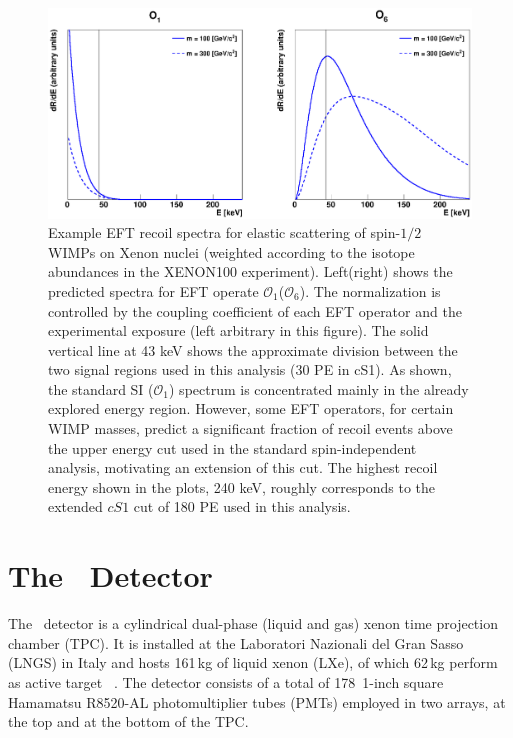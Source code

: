 \begin{figure}[h!]
\centerline{\includegraphics[width=1.\linewidth]{Figures/drdeO1O6.eps}}
\caption{Example EFT recoil spectra for elastic scattering of spin-$1/2$ WIMPs on Xenon nuclei (weighted according to the isotope abundances in the XENON100 experiment). Left(right) shows the predicted spectra for EFT operate $\mathcal{O}_1$($\mathcal{O}_6$). The normalization is controlled by the coupling coefficient of each EFT operator and the experimental exposure (left arbitrary in this figure). The solid vertical line at 43 keV shows the approximate division between the two signal regions used in this analysis (30 PE in cS1). As shown, the standard SI ($\mathcal{O}_1$) spectrum is concentrated mainly in the already explored energy region. However, some EFT operators, for certain WIMP masses, predict a significant fraction of recoil events above the upper energy cut used in the standard spin-independent analysis, motivating an extension of this cut. The highest recoil energy shown in the plots, 240 keV, roughly corresponds to the extended $cS1$ cut of 180 PE used in this analysis.}
\label{fig:dRdE}
\end{figure}

\section{The \Xehund\  Detector}
The \Xehund\ detector is a cylindrical %
dual-phase (liquid and gas) xenon time projection chamber (TPC). It is installed at the Laboratori Nazionali del Gran Sasso (LNGS) in Italy
and hosts 161\,kg of liquid xenon (LXe), of which 62\,kg perform as active target ~\cite{xe100_instr2012}. 
The detector consists of a total of 178~1-inch square Hamamatsu R8520-AL photomultiplier tubes (PMTs) employed in two arrays, at the top and at the bottom of the TPC. 

